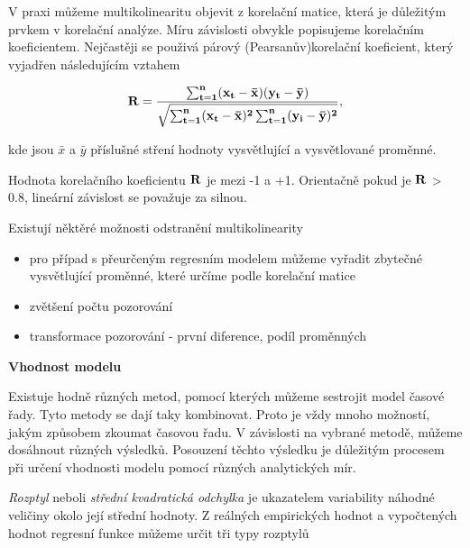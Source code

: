 \documentclass[a4paper,12pt,twoside]{scrreprt}
\begin{document}
V praxi můžeme multikolinearitu objevit z korelační matice, která je důležitým prvkem v korelační analýze. Míru závislosti obvykle popisujeme korelačním koeficientem. Nejčastěji se použivá párový (Pearsanův)korelační koeficient, který vyjadřen následujícím vztahem

\begin{equation}
\bf{R} = \frac{\sum_{t=1}^{n}(x_t - \bar{x})(y_t - \bar{y})}{\sqrt{\sum_{t=1}^{n}(x_t - \bar{x})^2\sum_{t=1}^{n}(y_i - \bar{y})^2}},
\end{equation}

kde jsou $\bar{x}$ a $\bar{y}$ příslušné stření hodnoty vysvětlující a vysvětlované proměnné. 

Hodnota korelačního koeficientu $\bf{R}$ je mezi -1 a +1. Orientačně pokud je $\bf{R}$ > 0.8, lineární závislost se považuje za silnou. 

Existují něktěré možnosti odstranění multikolinearity

\begin{itemize}
\item pro případ s přeurčeným regresním modelem můžeme vyřadit zbytečné vysvětlující proměnné, které určíme podle korelační matice  
\item zvětšení počtu pozorování
\item transformace pozorování - první diference, podíl proměnných
\end{itemize}

\normalsize\textbf{\newline Vhodnost modelu}  

Existuje hodně různých metod, pomocí kterých můžeme sestrojit model časové řady. Tyto metody se dají taky kombinovat. Proto je vždy mnoho možností, jakým způsobem zkoumat časovou řadu. V závislosti na vybrané metodě, můžeme dosáhnout různých výsledků. Posouzení těchto výsledku je důležitým procesem při určení vhodnosti modelu pomocí různých analytických mír.

\textit{Rozptyl} neboli \textit{střední kvadratická odchylka} je ukazatelem variability náhodné veličiny okolo její střední hodnoty. Z reálných empirických hodnot a vypočtených hodnot regresní funkce můžeme určit tři typy rozptylů
\end{document}
